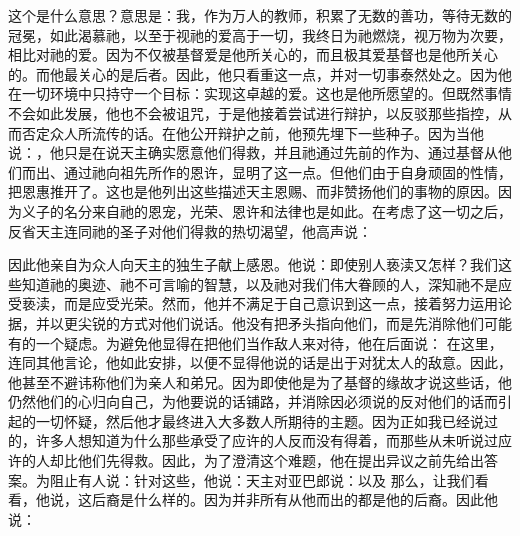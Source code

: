  这个是什么意思？意思是：我，作为万人的教师，积累了无数的善功，等待无数的冠冕，如此渴慕祂，以至于视祂的爱高于一切，我终日为祂燃烧，视万物为次要，相比对祂的爱。因为不仅被基督爱是他所关心的，而且极其爱基督也是他所关心的。而他最关心的是后者。因此，他只看重这一点，并对一切事泰然处之。因为他在一切环境中只持守一个目标：实现这卓越的爱。这也是他所愿望的。但既然事情不会如此发展，他也不会被诅咒，于是他接着尝试进行辩护，以反驳那些指控，从而否定众人所流传的话。在他公开辩护之前，他预先埋下一些种子。因为当他说：，他只是在说天主确实愿意他们得救，并且祂通过先前的作为、通过基督从他们而出、通过祂向祖先所作的恩许，显明了这一点。但他们由于自身顽固的性情，把恩惠推开了。这也是他列出这些描述天主恩赐、而非赞扬他们的事物的原因。因为义子的名分来自祂的恩宠，光荣、恩许和法律也是如此。在考虑了这一切之后，反省天主连同祂的圣子对他们得救的热切渴望，他高声说：\par

因此他亲自为众人向天主的独生子献上感恩。他说：即使别人亵渎又怎样？我们这些知道祂的奥迹、祂不可言喻的智慧，以及祂对我们伟大眷顾的人，深知祂不是应受亵渎，而是应受光荣。然而，他并不满足于自己意识到这一点，接着努力运用论据，并以更尖锐的方式对他们说话。他没有把矛头指向他们，而是先消除他们可能有的一个疑虑。为避免他显得在把他们当作敌人来对待，他在后面说： 在这里，连同其他言论，他如此安排，以便不显得他说的话是出于对犹太人的敌意。因此，他甚至不避讳称他们为亲人和弟兄。因为即使他是为了基督的缘故才说这些话，他仍然他们的心归向自己，为他要说的话铺路，并消除因必须说的反对他们的话而引起的一切怀疑，然后他才最终进入大多数人所期待的主题。因为正如我已经说过的，许多人想知道为什么那些承受了应许的人反而没有得着，而那些从未听说过应许的人却比他们先得救。因此，为了澄清这个难题，他在提出异议之前先给出答案。为阻止有人说：针对这些，他说：天主对亚巴郎说：以及 那么，让我们看看，他说，这后裔是什么样的。因为并非所有从他而出的都是他的后裔。因此他说：\par


